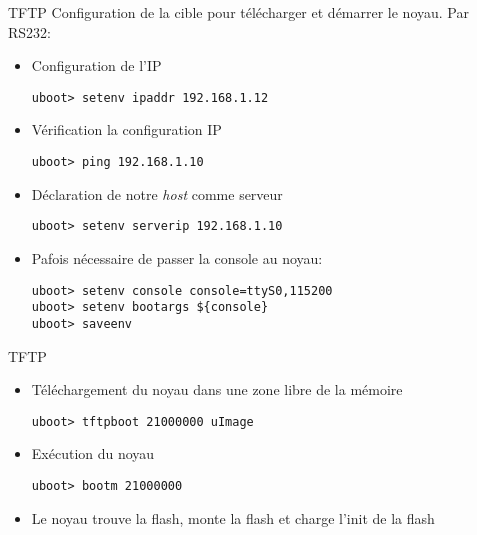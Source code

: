 \begin{frame}[fragile=singleslide]{TFTP}
  Configuration de la cible pour télécharger et démarrer le noyau. Par RS232:
  \begin{itemize}
  \item Configuration de l'IP
    \begin{lstlisting}
uboot> setenv ipaddr 192.168.1.12
    \end{lstlisting}
  \item Vérification la configuration IP
    \begin{lstlisting}
uboot> ping 192.168.1.10
    \end{lstlisting}
  \item Déclaration de notre \emph{host} comme serveur 
    \begin{lstlisting}
uboot> setenv serverip 192.168.1.10
    \end{lstlisting}
 \item Pafois nécessaire de passer la console au noyau:
    \begin{lstlisting}
uboot> setenv console console=ttyS0,115200
uboot> setenv bootargs ${console}
uboot> saveenv
    \end{lstlisting}
  \end{itemize}
\end{frame}

\begin{frame}[fragile=singleslide]{TFTP}
  \begin{itemize}
  \item Téléchargement du noyau dans une zone libre de la mémoire
    \begin{lstlisting}
uboot> tftpboot 21000000 uImage
    \end{lstlisting}
  \item Exécution du noyau
    \begin{lstlisting}
uboot> bootm 21000000
    \end{lstlisting}
  \item Le noyau  trouve la flash, monte la flash  et charge l'init de
    la flash
  \end{itemize}
\end{frame}

